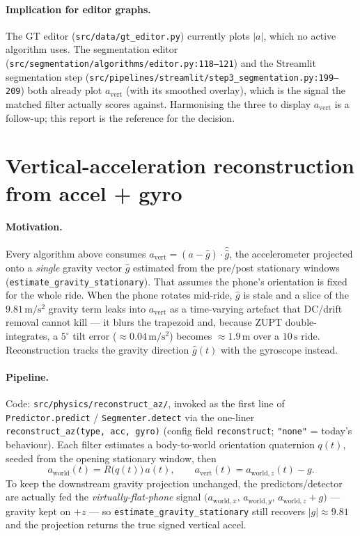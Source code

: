 \documentclass[11pt,a4paper]{article}
\newcommand{\avert}{a_{\mathrm{vert}}}
\newcommand{\amag}{\lvert a\rvert}
\newcommand{\ghat}{\hat{g}}
\begin{document}
\paragraph{Implication for editor graphs.}
The GT editor (\texttt{src/data/gt\_editor.py}) currently plots
$\amag$, which no active algorithm uses. The segmentation editor
(\texttt{src/segmentation/algorithms/editor.py:118--121}) and the
Streamlit segmentation step
(\texttt{src/pipelines/streamlit/step3\_segmentation.py:199--209})
both already plot $\avert$ (with its smoothed overlay), which is the
signal the matched filter actually scores against. Harmonising the
three to display $\avert$ is a follow-up; this report is the
reference for the decision.

\section{Vertical-acceleration reconstruction from accel + gyro}

\paragraph{Motivation.}
Every algorithm above consumes $\avert = (a-\ghat)\cdot\hat\ghat$, the
accelerometer projected onto a \emph{single} gravity vector $\ghat$
estimated from the pre/post stationary windows
(\texttt{estimate\_gravity\_stationary}). That assumes the phone's
orientation is fixed for the whole ride. When the phone rotates mid-ride,
$\ghat$ is stale and a slice of the $9.81\,\mathrm{m/s^2}$ gravity term
leaks into $\avert$ as a time-varying artefact that DC/drift removal cannot
kill --- it blurs the trapezoid and, because ZUPT double-integrates, a
$5^\circ$ tilt error ($\approx 0.04\,\mathrm{m/s^2}$) becomes
$\approx 1.9\,\mathrm{m}$ over a $10\,\mathrm{s}$ ride. Reconstruction
tracks the gravity direction $\ghat(t)$ with the gyroscope instead.

\paragraph{Pipeline.}
Code: \texttt{src/physics/reconstruct\_az/}, invoked as the first line of
\texttt{Predictor.predict} / \texttt{Segmenter.detect} via the one-liner
\verb|reconstruct_az(type, acc, gyro)| (config field \texttt{reconstruct};
\texttt{"none"} = today's behaviour). Each filter estimates a body-to-world
orientation quaternion $q(t)$, seeded from the opening stationary window,
then
\[
  a_{\mathrm{world}}(t) = R\!\big(q(t)\big)\,a(t),
  \qquad
  \avert(t) = a_{\mathrm{world},z}(t) - g .
\]
To keep the downstream gravity projection unchanged, the predictors/detector
are actually fed the \emph{virtually-flat-phone} signal
$\big(a_{\mathrm{world},x},\,a_{\mathrm{world},y},\,a_{\mathrm{world},z}+g\big)$
--- gravity kept on $+z$ --- so \texttt{estimate\_gravity\_stationary} still
recovers $\lvert g\rvert\!\approx\!9.81$ and the projection returns the true
signed vertical accel.
\end{document}
